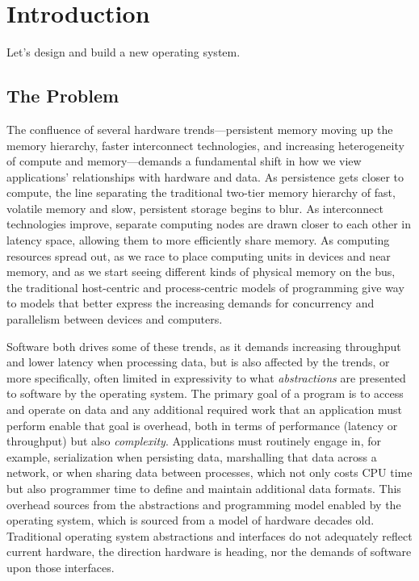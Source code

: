 
\chapter{Introduction}\label{ch:intro}

Let's design and build a new operating system.

\section*{The Problem}

The confluence of several hardware trends---persistent memory moving up the memory hierarchy, faster interconnect
technologies, and increasing heterogeneity of compute and memory---demands a fundamental shift in how we view
applications' relationships with hardware and data. As persistence gets closer to compute, the line separating the traditional two-tier
memory hierarchy of fast, volatile memory and slow, persistent storage begins to blur. As interconnect technologies
improve, separate computing nodes are drawn closer to each other in latency space, allowing them to more efficiently
share memory. As computing resources spread out, as we race to place computing units in devices and near memory, and as
we start seeing different kinds of physical memory on the bus, the traditional host-centric and process-centric models
of programming give way to models that better express the increasing demands for concurrency and parallelism between
devices and computers.

Software both drives some of these trends, as it demands increasing throughput and lower latency when processing data,
but is also affected by the trends, or more specifically, often limited in expressivity to what \emph{abstractions} are
presented to software by the operating system. The primary goal of a program is to access and operate on data and any
additional required work that an application must perform enable that goal is overhead, both in terms of performance
(latency or throughput) but also \emph{complexity}. Applications must routinely engage in, for example, serialization
when persisting data, marshalling that data across a network, or when sharing data between processes, which not only
costs CPU time but also programmer time to define and maintain additional data formats. This overhead sources from the
abstractions and programming model enabled by the operating system, which is sourced from a model of hardware decades
old. Traditional operating system abstractions and interfaces do not adequately reflect current hardware, the direction hardware is
heading, nor the demands of software upon those interfaces.

